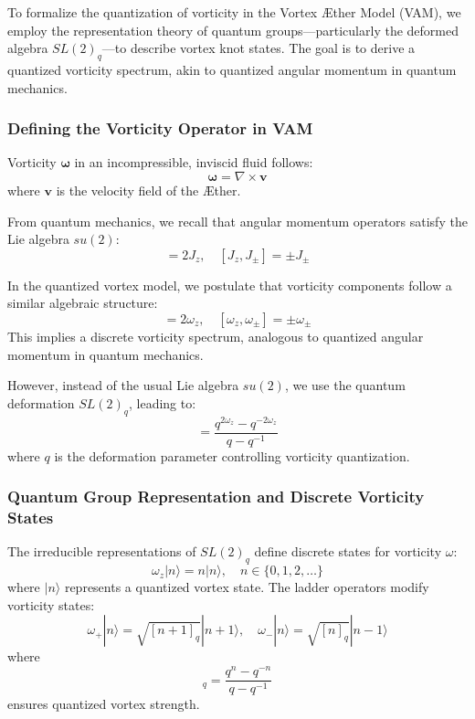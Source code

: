 \documentclass[a4paper,10pt]{article}
\begin{document}
To formalize the quantization of vorticity in the Vortex Æther Model (VAM), we employ the representation theory of quantum groups—particularly the deformed algebra $SL(2)_q$—to describe vortex knot states. The goal is to derive a quantized vorticity spectrum, akin to quantized angular momentum in quantum mechanics.

\subsubsection*{Defining the Vorticity Operator in VAM}
Vorticity $\boldsymbol{\omega}$ in an incompressible, inviscid fluid follows:
\begin{equation*}
    \boldsymbol{\omega} = \nabla \times \mathbf{v}
\end{equation*}
where $\mathbf{v}$ is the velocity field of the Æther.

From quantum mechanics, we recall that angular momentum operators satisfy the Lie algebra $su(2)$:
\begin{equation*}
[J_+, J_-] = 2J_z, \quad [J_z, J_{\pm}] = \pm J_{\pm}
\end{equation*}

In the quantized vortex model, we postulate that vorticity components follow a similar algebraic structure:
\begin{equation*}
[\omega_+, \omega_-] = 2\omega_z, \quad [\omega_z, \omega_{\pm}] = \pm \omega_{\pm}
\end{equation*}
This implies a discrete vorticity spectrum, analogous to quantized angular momentum in quantum mechanics.

However, instead of the usual Lie algebra $su(2)$, we use the quantum deformation $SL(2)_q$, leading to:
\begin{equation*}
[\omega_+, \omega_-] = \frac{q^{2\omega_z} - q^{-2\omega_z}}{q - q^{-1}}
\end{equation*}
where $q$ is the deformation parameter controlling vorticity quantization.

\subsubsection*{Quantum Group Representation and Discrete Vorticity States}
The irreducible representations of $SL(2)_q$ define discrete states for vorticity $\omega$:
\begin{equation*}
    \omega_z |n\rangle = n |n\rangle, \quad n \in \{0, 1, 2, \dots\}
\end{equation*}
where $|n\rangle$ represents a quantized vortex state. The ladder operators modify vorticity states:
\begin{equation*}
    \omega_+ |n\rangle = \sqrt{[n+1]_q} |n+1\rangle, \quad \omega_- |n\rangle = \sqrt{[n]_q} |n-1\rangle
\end{equation*}
where
\begin{equation*}
[n]_q = \frac{q^n - q^{-n}}{q - q^{-1}}
\end{equation*}
ensures quantized vortex strength.
\end{document}
